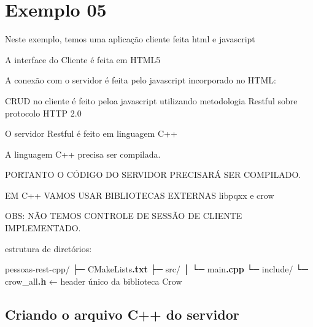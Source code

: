 \documentclass[
]{book}
\newenvironment{Shaded}{\begin{snugshade}}{\end{snugshade}}
\newcommand{\FunctionTok}[1]{\textcolor[rgb]{0.13,0.29,0.53}{\textbf{#1}}}
\newcommand{\NormalTok}[1]{#1}
\begin{document}
\section{Exemplo 05}\label{exemplo-05}

Neste exemplo, temos uma aplicação cliente feita html e javascript

A interface do Cliente é feita em HTML5

A conexão com o servidor é feita pelo javascript incorporado no HTML:

CRUD no cliente é feito peloa javascript utilizando metodologia Restful sobre protocolo HTTP 2.0

O servidor Restful é feito em linguagem C++

A linguagem C++ precisa ser compilada.

PORTANTO O CÓDIGO DO SERVIDOR PRECISARÁ SER COMPILADO.

EM C++ VAMOS USAR BIBLIOTECAS EXTERNAS libpqxx e crow

OBS: NÃO TEMOS CONTROLE DE SESSÃO DE CLIENTE IMPLEMENTADO.

estrutura de diretórios:

\begin{Shaded}
\begin{Highlighting}[]
\NormalTok{pessoas{-}rest{-}cpp/}
\NormalTok{├─ CMakeLists}\FunctionTok{.txt}
\NormalTok{├─ src/}
\NormalTok{│   └─ main}\FunctionTok{.cpp}
\NormalTok{└─ include/}
\NormalTok{    └─ crow\_all}\FunctionTok{.h}\NormalTok{        ← header único da biblioteca Crow}
\end{Highlighting}
\end{Shaded}

\subsection{Criando o arquivo C++ do servidor}\label{criando-o-arquivo-c-do-servidor}
\end{document}
